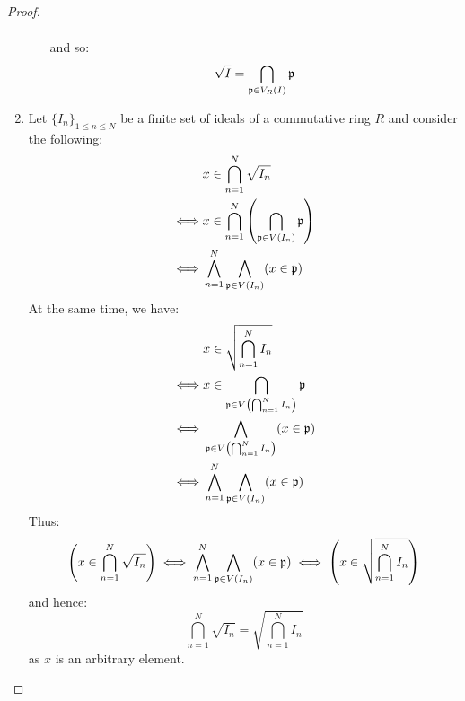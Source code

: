\begin{proof}
\begin{enumerate}
\begin{enumerate}
$$\begin{aligned}
                                                \end{aligned}
                                            $$
                                        and so:
                                            $$\sqrt{I} = \bigcap_{\mathfrak{p} \in V_R(I)} \mathfrak{p}$$
                                    \end{enumerate}
                                \item Let $\{I_n\}_{1 \leq n \leq N}$ be a finite set of ideals of a commutative ring $R$ and consider the following:
                                    $$
                                        \begin{aligned}
                                            & x \in \bigcap_{n = 1}^N \sqrt{I_n}
                                            \\
                                            \iff & x \in \bigcap_{n = 1}^N \left(\bigcap_{\mathfrak{p} \in V(I_n)} \mathfrak{p} \right)
                                            \\
                                            \iff & \bigwedge_{n = 1}^N \bigwedge_{\mathfrak{p} \in V(I_n)} (x \in \mathfrak{p})
                                        \end{aligned}
                                    $$
                                At the same time, we have:
                                    $$
                                        \begin{aligned}
                                            & x \in \sqrt{\bigcap_{n = 1}^N I_n}
                                            \\
                                            \iff & x \in \bigcap_{\mathfrak{p} \in V\left(\bigcap_{n = 1}^N I_n\right)} \mathfrak{p}
                                            \\
                                            \iff & \bigwedge_{\mathfrak{p} \in V\left(\bigcap_{n = 1}^N I_n\right)} (x \in \mathfrak{p})
                                            \\
                                            \iff & \bigwedge_{n = 1}^N \bigwedge_{\mathfrak{p} \in V(I_n)} (x \in \mathfrak{p})
                                        \end{aligned}
                                    $$
                                Thus:
                                    $$\left(x \in \bigcap_{n = 1}^N \sqrt{I_n}\right) \iff \bigwedge_{n = 1}^N \bigwedge_{\mathfrak{p} \in V(I_n)} (x \in \mathfrak{p}) \iff \left(x \in \sqrt{\bigcap_{n = 1}^N I_n}\right)$$
                                and hence:
                                    $$\bigcap_{n = 1}^N \sqrt{I_n} = \sqrt{\bigcap_{n = 1}^N I_n}$$
                                as $x$ is an arbitrary element.
                            \end{enumerate}
                    \end{proof}
